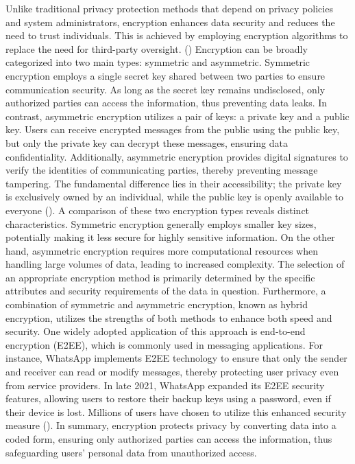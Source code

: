 \documentclass[a4paper,12pt]{article}
\begin{document}
Unlike traditional privacy protection methods that depend on privacy policies and system administrators, encryption enhances data security and reduces the need to trust individuals. This is achieved by employing encryption algorithms to replace the need for third-party oversight. (\cite{balsa2022cryptography}) Encryption can be broadly categorized into two main types: symmetric and asymmetric. Symmetric encryption employs a single secret key shared between two parties to ensure communication security. As long as the secret key remains undisclosed, only authorized parties can access the information, thus preventing data leaks. In contrast, asymmetric encryption utilizes a pair of keys: a private key and a public key. Users can receive encrypted messages from the public using the public key, but only the private key can decrypt these messages, ensuring data confidentiality. Additionally, asymmetric encryption provides digital signatures to verify the identities of communicating parties, thereby preventing message tampering. The fundamental difference lies in their accessibility; the private key is exclusively owned by an individual, while the public key is openly available to everyone (\cite{maqsood2017cryptography}). A comparison of these two encryption types reveals distinct characteristics. Symmetric encryption generally employs smaller key sizes, potentially making it less secure for highly sensitive information. On the other hand, asymmetric encryption requires more computational resources when handling large volumes of data, leading to increased complexity. The selection of an appropriate encryption method is primarily determined by the specific attributes and security requirements of the data in question. Furthermore, a combination of symmetric and asymmetric encryption, known as hybrid encryption, utilizes the strengths of both methods to enhance both speed and security. One widely adopted application of this approach is end-to-end encryption (E2EE), which is commonly used in messaging applications. For instance, WhatsApp implements E2EE technology to ensure that only the sender and receiver can read or modify messages, thereby protecting user privacy even from service providers. In late 2021, WhatsApp expanded its E2EE security features, allowing users to restore their backup keys using a password, even if their device is lost. Millions of users have chosen to utilize this enhanced security measure (\cite{davies2023security}). In summary, encryption protects privacy by converting data into a coded form, ensuring only authorized parties can access the information, thus safeguarding users' personal data from unauthorized access.
 
\end{document}
